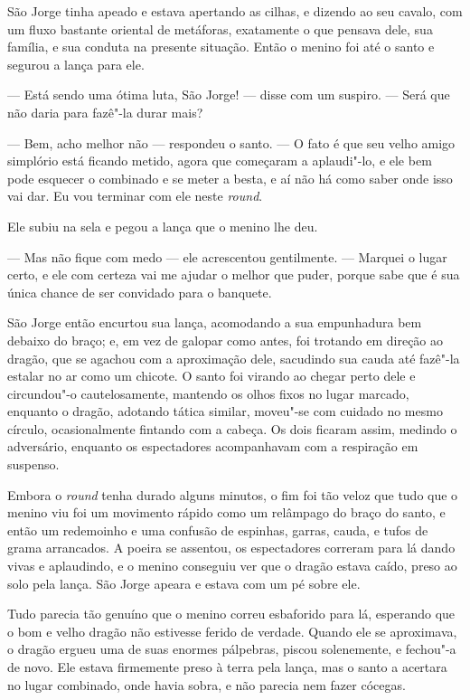 São Jorge tinha apeado e estava apertando as cilhas, e dizendo ao seu
cavalo, com um fluxo bastante oriental de metáforas, exatamente o que
pensava dele, sua família, e sua conduta na presente situação. Então
o menino foi até o santo e segurou a lança para ele.

--- Está sendo uma ótima luta, São Jorge! --- disse com um suspiro. --- Será
que não daria para fazê"-la durar mais? 

--- Bem, acho melhor não --- respondeu o santo. --- O fato é que seu velho
amigo simplório está ficando metido, agora que começaram a
aplaudi"-lo, e ele bem pode esquecer o combinado e se meter a besta, e
aí não há como saber onde isso vai dar. Eu vou terminar com ele neste
\textit{round}.

Ele subiu na sela e pegou a lança que o menino lhe deu.

--- Mas não fique com medo --- ele acrescentou gentilmente. --- Marquei o
lugar certo, e ele com certeza vai me ajudar o melhor que puder,
porque sabe que é sua única chance de ser convidado para o banquete.

São Jorge então encurtou sua lança, acomodando a sua empunhadura bem
debaixo do braço; e, em vez de galopar como antes, foi trotando em
direção ao dragão, que se agachou com a aproximação dele, sacudindo sua
cauda até fazê"-la estalar no ar como um chicote. O santo foi virando
ao chegar perto dele e circundou"-o cautelosamente, mantendo os olhos
fixos no lugar marcado, enquanto o dragão, adotando tática similar,
moveu"-se com cuidado no mesmo círculo, ocasionalmente fintando com a
cabeça. Os dois ficaram assim, medindo o adversário, enquanto os
espectadores acompanhavam com a respiração em suspenso.

Embora o \textit{round} tenha durado alguns minutos, o fim foi tão veloz que
tudo que o menino viu foi um movimento rápido como um relâmpago do
braço do santo, e então um redemoinho e uma confusão de espinhas,
garras, cauda, e tufos de grama arrancados. A poeira se assentou, os
espectadores correram para lá dando vivas e aplaudindo, e o menino
conseguiu ver que o dragão estava caído, preso ao solo pela lança.
São Jorge apeara e estava com um pé sobre ele.

Tudo parecia tão genuíno que o menino correu esbaforido para lá,
esperando que o bom e velho dragão não estivesse ferido de verdade.
Quando ele se aproximava, o dragão ergueu uma de suas enormes
pálpebras, piscou solenemente, e fechou"-a de novo. Ele estava
firmemente preso à terra pela lança, mas o santo a acertara no lugar
combinado, onde havia sobra, e não parecia nem fazer cócegas.


